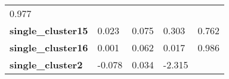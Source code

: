 \documentclass[]{article}
\begin{document}
\begin{longtable}[c]{@{}lllll@{}}
\begin{minipage}[t]{0.12\columnwidth}\raggedright\strut
0.977
\strut\end{minipage}\tabularnewline
\begin{minipage}[t]{0.31\columnwidth}\raggedright\strut
\textbf{single\_cluster15}
\strut\end{minipage} &
\begin{minipage}[t]{0.13\columnwidth}\raggedright\strut
0.023
\strut\end{minipage} &
\begin{minipage}[t]{0.16\columnwidth}\raggedright\strut
0.075
\strut\end{minipage} &
\begin{minipage}[t]{0.12\columnwidth}\raggedright\strut
0.303
\strut\end{minipage} &
\begin{minipage}[t]{0.12\columnwidth}\raggedright\strut
0.762
\strut\end{minipage}\tabularnewline
\begin{minipage}[t]{0.31\columnwidth}\raggedright\strut
\textbf{single\_cluster16}
\strut\end{minipage} &
\begin{minipage}[t]{0.13\columnwidth}\raggedright\strut
0.001
\strut\end{minipage} &
\begin{minipage}[t]{0.16\columnwidth}\raggedright\strut
0.062
\strut\end{minipage} &
\begin{minipage}[t]{0.12\columnwidth}\raggedright\strut
0.017
\strut\end{minipage} &
\begin{minipage}[t]{0.12\columnwidth}\raggedright\strut
0.986
\strut\end{minipage}\tabularnewline
\begin{minipage}[t]{0.31\columnwidth}\raggedright\strut
\textbf{single\_cluster2}
\strut\end{minipage} &
\begin{minipage}[t]{0.13\columnwidth}\raggedright\strut
-0.078
\strut\end{minipage} &
\begin{minipage}[t]{0.16\columnwidth}\raggedright\strut
0.034
\strut\end{minipage} &
\begin{minipage}[t]{0.12\columnwidth}\raggedright\strut
-2.315
\strut\end{minipage} &
\begin{minipage}[t]{0.12\columnwidth}\raggedright\strut

\end{minipage}
\end{longtable}
\end{document}
